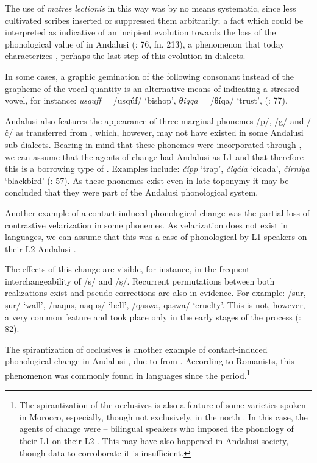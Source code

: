 \documentclass[output=paper,modfonts,nonflat]{langsci/langscibook}
\begin{document}
The use of \textit{matres} \textit{lectionis} in this way was by no means systematic, since {less cultivated scribes inserted or suppressed them arbitrarily}; a fact which could be interpreted as indicative of an incipient evolution towards the loss of the phonological value of  in Andalusi  (\citealt{CorrientePereiraVicente2015}: 76, fn. 213), a phenomenon that today characterizes  , perhaps the last step of this evolution in   dialects.

{In some cases, a graphic gemination of the following consonant instead of the grapheme of the vocal quantity is an alternative means of indicating a stressed vowel, for instance: {} \textit{usquff} = /usqúf/ ‘bishop’, {} \textit{θiqqa} = /θíqa/ ‘trust’,} {(\citealt{CorrientePereiraVicente2015}: 77)}{.} 

Andalusi  also features the appearance of three marginal phonemes /p/, /g/ and /č/ as transferred from , which, however, may not have existed in some Andalusi sub-dialects. Bearing in mind that these phonemes were incorporated through  \citep{Corriente1978}, we can assume that the agents of change had Andalusi  as L1 and that therefore this is a borrowing type of . Examples include: \textit{čípp} ‘trap’, \textit{čiqála} ‘cicada’, \textit{čírniya} ‘blackbird’ (\citealt{CorrientePereiraVicente2015}: 57). As these phonemes exist even in late toponymy it may be concluded that they were part of the Andalusi phonological system. 

Another example of a contact-induced phonological change was the partial loss of contrastive velarization in some phonemes. As velarization does not exist in  languages, we can assume that this was a case of phonological  by L1  speakers on their L2 Andalusi . 

The effects of this change are visible, for instance, in the frequent interchangeability of /s/ and /ṣ/. Recurrent permutations between both realizations exist and pseudo-corrections are also in evidence. For example: /sūr, ṣūr/ ‘wall’, /nāqūs, nāqūṣ/ ‘bell’, /qaswa, qaṣwa/ ‘cruelty’. This is not, however, a very common feature and took place only in the early stages of the  process (\citealt{CorrientePereiraVicente2015}: 82). 

The spirantization of occlusives is another example of contact-induced phonological change in Andalusi , due to  from . According to Romanists, this phenomenon was commonly found in  languages since the  period.\footnote{The spirantization of the occlusives is also a feature of some  varieties spoken in Morocco, especially, though not exclusively, in the north \citep[235--236]{SánchezVicente2012}. In this case, the agents of change were -- bilingual speakers who imposed the phonology of their L1  on their L2 . This may have also happened in Andalusi society, though data to corroborate it is insufficient.}
\end{document}
